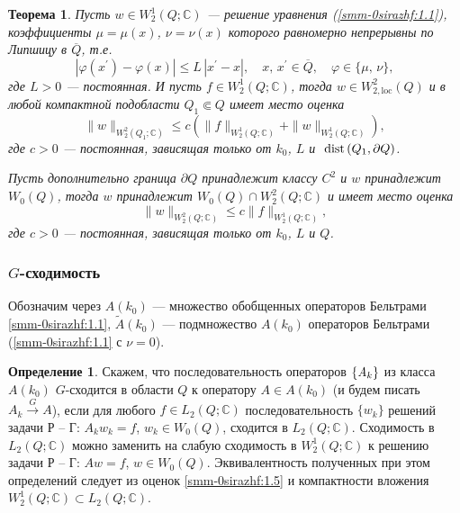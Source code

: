 \documentclass[a4paper,12pt]{article}
\newtheorem{theorem}{Теорема}[section]
\theoremstyle{definition}
\newtheorem{definition}{Определение}[section]
\begin{document}
\begin{theorem}\label{smm2-th2} Пусть $w\in W_2^1(Q;\mathbb{C})$ --- решение уравнения  {(\ref{smm-0sirazhf:1.1})}, коэффициенты $\mu=\mu(x)$, $\nu=\nu(x)$ которого равномерно непрерывны по Липшицу в $\overline Q$, т.е.
	$$
	|\varphi(x^\prime)-\varphi(x)|\leqslant L\,|x^\prime-x|,\quad x,\,x^\prime\in \overline{Q},\quad \varphi\in\{\mu,\,\nu\},
	$$
	где $L>0$ --- постоянная. И пусть  $f\in W_2^1(Q;\mathbb{C})$, тогда $w\in W_{2,\text{loc}}^2(Q)$ и в любой компактной подобласти $Q_1\Subset Q$ имеет место оценка
	\begin{equation}\label{smm-0sirazhf:1.6_1}
		\|w\|_{W^2_2(Q_1; \mathbb{C})}\leqslant c\left(\|f\|_{W^1_2(Q; \mathbb{C})}+\|w\|_{W^1_2(Q; \mathbb{C})}\right),
	\end{equation}
	где $c>0$ --- постоянная, зависящая только от $k_0$, $L$ и $\text{ dist\,}(Q_1,\partial Q)$.


Пусть дополнительно граница $\partial Q$ принадлежит классу $C^2$ и $w$ принадлежит $W_0(Q)$, тогда $w$ принадлежит $W_0(Q)\cap W_2^2(Q; \mathbb{C})$ и имеет место оценка
\begin{equation}\label{smm-0sirazhf:1.6_2}
	\|w\|_{W^2_2(Q; \mathbb{C})}\leqslant c\|f\|_{W^1_2(Q; \mathbb{C})},
\end{equation}
где $c>0$ --- постоянная, зависящая только от $k_0$, $L$ и $Q$.
\end{theorem}

\subsubsection{$G$-сходимость}
Обозначим через $A(k_0)$ --- множество обобщенных  операторов Бельтрами
\eqref{smm-0sirazhf:1.1}, $\tilde{A}(k_0)$ --- подмножество $A(k_0)$  операторов Бельтрами
(\eqref{smm-0sirazhf:1.1} с $\nu=0$).

\begin{definition}
Скажем, что последовательность операторов $\left\{ {\it A}_k\right\}$ из класса $A(k_0)$
$G$-сходится в области $Q$ к оператору $A\in A(k_0)$
(и будем писать $A_k\overset{G}{\longrightarrow} A$),
если для любого $f\in L_2(Q;\mathbb{C})$ последовательность $\{w_k\}$ решений задачи Р -- Г: $A_kw_k=f$, $w_k\in W_0(Q)$,
сходится в $L_2(Q;\mathbb{C})$. Сходимость в
$L_2(Q;\mathbb{C})$ можно заменить на слабую сходимость в
$W_2^1(Q;\mathbb{C})$ к решению задачи Р -- Г: $Aw=f$, $w\in W_0(Q)$. Эквивалентность полученных при этом определений следует из оценок \eqref{smm-0sirazhf:1.5} и компактности вложения
$W_2^1(Q;\mathbb{C})\subset L_2(Q;\mathbb{C})$.
\end{definition}
\end{document}
